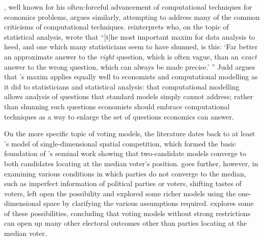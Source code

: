 \documentclass[12pt]{article}
\numberwithin{equation}{subsection}
\begin{document}
\citet{hce:Judd}, well known for his often-forceful advancement of computational techniques for
economics problems, argues similarly, attempting to address many of the common criticisms of
computational techniques.  \citeauthor{hce:Judd} reinterprets \citet{Tukey62} who, on the topic of
statistical analysis, wrote that ``[t]he most important maxim for data analysis to heed, and one
which many statisticians seem to have shunned, is this: `Far better an approximate answer to the
\emph{right} question, which is often vague, than an \emph{exact} answer to the wrong question,
which can always be made precise.' ''  Judd argues that \citeauthor{Tukey62}'s maxim applies equally
well to economists and computational modelling as it did to statisticians and statistical analysis:
that computational modelling allows analysis of questions that standard models simply cannot
address; rather than shunning such questions economists should embrace computational techniques as a
way to enlarge the set of questions economics can answer.

On the more specific topic of voting models, the literature dates back to at least \citet{Hotel29}'s
model of single-dimensional spatial competition, which formed the basic foundation of
\citet{Downs57}'s seminal work showing that two-candidate models converge to both candidates
locating at the median voter's position.  \citeauthor{Downs57} goes further, however, in examining
various conditions in which parties do not converge to the median, such as imperfect information of
political parties or voters, shifting tastes of voters, left open the possibility and explored some
richer models using the one-dimensional space by clarifying the various assumptions required.
\citeauthor{Downs57} explores some of these possibilities, concluding that voting models without
strong restrictions can open up many other electoral outcomes other than parties locating at the
median voter.
\end{document}
